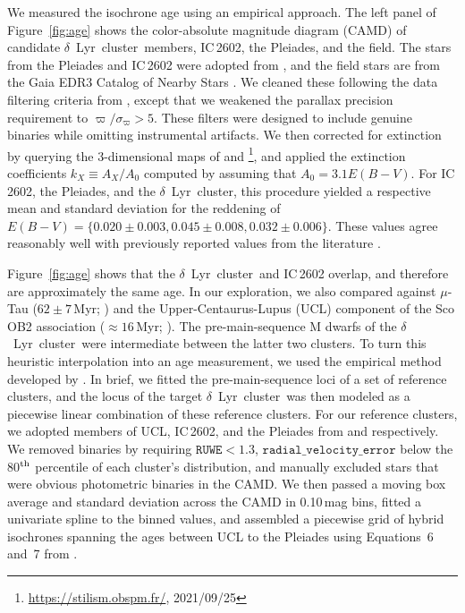 \documentclass[12pt,modern,twocolumn,tighten]{aastex63}
\newcommand{\cn}{$\delta$\ Lyr\ cluster} %
\begin{document}
We measured the isochrone age using an empirical approach.  The left
panel of Figure~\ref{fig:age} shows the color-absolute magnitude
diagram (CAMD) of candidate \cn\ members, IC\,2602, the Pleiades, and the
field.  
The stars from the Pleiades and IC\,2602 were adopted from
\citet{cantatgaudin_gaia_2018}, and the field stars are from the Gaia
EDR3 Catalog of Nearby Stars \citep{gaia_gcns_2021}.  We cleaned these
following the data filtering criteria from
\citet[][Appendix B]{GaiaCollaboration2018}, except that we weakened the parallax
precision requirement to $\varpi/\sigma_\varpi>5$.  These filters were
designed to include genuine binaries while omitting instrumental
artifacts.  We then corrected for extinction by querying the
3-dimensional maps of \citet{capitanio_threedimensional_2017} and
\citet{lallement_threedimensional_2018}\footnote{\url{https://stilism.obspm.fr/}, 2021/09/25},
and applied the extinction coefficients $k_X\equiv A_X/A_0$
computed by \citet{GaiaCollaboration2018} assuming that $A_0 = 3.1
E(B-V)$.  For IC\,2602, the Pleiades, and the \cn, this procedure
yielded a respective mean and standard deviation for the reddening of
$E(B-V)=\{0.020\pm0.003, 0.045\pm0.008, 0.032\pm0.006\}$.  These
values agree reasonably well with previously reported values from the
literature \citep[{\it
e.g.},][]{GaiaCollaboration2018,kounkel_untangling_2019,bossini_age_2019}.

%
%
%

Figure~\ref{fig:age} shows that the \cn\ and IC\,2602 overlap, and
therefore are approximately the same age.  In our exploration, we also
compared against $\mu$-Tau ($62\pm7$\,Myr; \citealt{gagne_mutau_2020})
and the Upper-Centaurus-Lupus (UCL) component of the Sco OB2
association ($\approx$$16$\,Myr; \citealt{pecaut_star_2016}).  The
pre-main-sequence M dwarfs of the \cn\ were intermediate between the
latter two clusters.  To turn this heuristic interpolation into an age
measurement, we used the empirical method developed by
\citet{gagne_mutau_2020}.  In brief, we fitted the pre-main-sequence
loci of a set of reference clusters, and the locus of the target \cn\
was then modeled as a piecewise linear combination of these reference
clusters.  For our reference clusters, we adopted members of UCL,
IC\,2602, and the Pleiades from \citet{damiani_stellar_2019} and
\cite{CantatGaudin2018a} respectively.  We removed binaries by
requiring $\texttt{RUWE}<1.3$, $\texttt{radial\_velocity\_error}$
below the 80$^{\rm th}$ percentile of each cluster's distribution, and
manually excluded stars that were obvious photometric binaries in the
CAMD.  We then passed a moving box average and standard deviation
across the CAMD in 0.10\,mag bins, fitted a univariate spline to the
binned values, and assembled a piecewise grid of hybrid isochrones
spanning the ages between UCL to the Pleiades using Equations~6 and~7
from \citet{gagne_mutau_2020}.  
\end{document}
